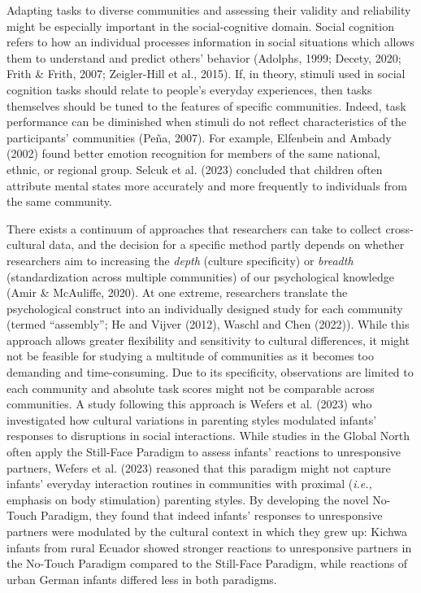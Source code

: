 \documentclass[
  man,floatsintext]{apa7}
\begin{document}
Adapting tasks to diverse communities and assessing their validity and reliability might be especially important in the social-cognitive domain.
Social cognition refers to how an individual processes information in social situations which allows them to understand and predict others' behavior (Adolphs, 1999; Decety, 2020; Frith \& Frith, 2007; Zeigler-Hill et al., 2015).
If, in theory, stimuli used in social cognition tasks should relate to people's everyday experiences, then tasks themselves should be tuned to the features of specific communities.
Indeed, task performance can be diminished when stimuli do not reflect characteristics of the participants' communities (Peña, 2007).
For example, Elfenbein and Ambady (2002) found better emotion recognition for members of the same national, ethnic, or regional group.
Selcuk et al. (2023) concluded that children often attribute mental states more accurately and more frequently to individuals from the same community.

There exists a continuum of approaches that researchers can take to collect cross-cultural data, and the decision for a specific method partly depends on whether researchers aim to increasing the \emph{depth} (culture specificity) or \emph{breadth} (standardization across multiple communities) of our psychological knowledge (Amir \& McAuliffe, 2020).
At one extreme, researchers translate the psychological construct into an individually designed study for each community (termed ``assembly''; He and Vijver (2012), Waschl and Chen (2022)).
While this approach allows greater flexibility and sensitivity to cultural differences, it might not be feasible for studying a multitude of communities as it becomes too demanding and time-consuming.
Due to its specificity, observations are limited to each community and absolute task scores might not be comparable across communities.
A study following this approach is Wefers et al. (2023) who investigated how cultural variations in parenting styles modulated infants' responses to disruptions in social interactions.
While studies in the Global North often apply the Still-Face Paradigm to assess infants' reactions to unresponsive partners, Wefers et al. (2023) reasoned that this paradigm might not capture infants' everyday interaction routines in communities with proximal (\emph{i.e.,} emphasis on body stimulation) parenting styles.
By developing the novel No-Touch Paradigm, they found that indeed infants' responses to unresponsive partners were modulated by the cultural context in which they grew up: Kichwa infants from rural Ecuador showed stronger reactions to unresponsive partners in the No-Touch Paradigm compared to the Still-Face Paradigm, while reactions of urban German infants differed less in both paradigms.
\end{document}
